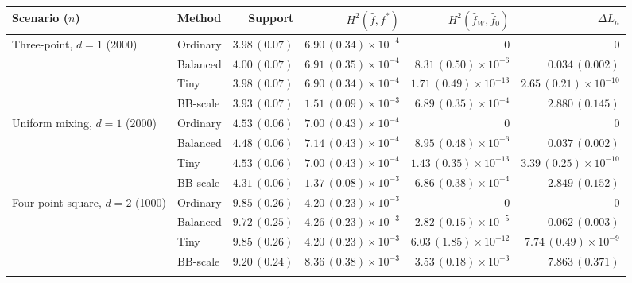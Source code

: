 \begin{tabular}{@{}llrrrr@{}}
\toprule
Scenario ($n$) & Method & Support & $H^2(\widehat f,f^*)$ & $H^2(\widehat f_W,\widehat f_0)$ & $\Delta L_n$ \\
\midrule
Three-point, $d=1$ (2000) & Ordinary & $3.98\,(0.07)$ & $6.90\,(0.34)\times 10^{-4}$ & $0$ & $0$ \\
 & Balanced & $4.00\,(0.07)$ & $6.91\,(0.35)\times 10^{-4}$ & $8.31\,(0.50)\times 10^{-6}$ & $0.034\,(0.002)$ \\
 & Tiny & $3.98\,(0.07)$ & $6.90\,(0.34)\times 10^{-4}$ & $1.71\,(0.49)\times 10^{-13}$ & $2.65\,(0.21)\times 10^{-10}$ \\
 & BB-scale & $3.93\,(0.07)$ & $1.51\,(0.09)\times 10^{-3}$ & $6.89\,(0.35)\times 10^{-4}$ & $2.880\,(0.145)$ \\
\addlinespace
Uniform mixing, $d=1$ (2000) & Ordinary & $4.53\,(0.06)$ & $7.00\,(0.43)\times 10^{-4}$ & $0$ & $0$ \\
 & Balanced & $4.48\,(0.06)$ & $7.14\,(0.43)\times 10^{-4}$ & $8.95\,(0.48)\times 10^{-6}$ & $0.037\,(0.002)$ \\
 & Tiny & $4.53\,(0.06)$ & $7.00\,(0.43)\times 10^{-4}$ & $1.43\,(0.35)\times 10^{-13}$ & $3.39\,(0.25)\times 10^{-10}$ \\
 & BB-scale & $4.31\,(0.06)$ & $1.37\,(0.08)\times 10^{-3}$ & $6.86\,(0.38)\times 10^{-4}$ & $2.849\,(0.152)$ \\
\addlinespace
Four-point square, $d=2$ (1000) & Ordinary & $9.85\,(0.26)$ & $4.20\,(0.23)\times 10^{-3}$ & $0$ & $0$ \\
 & Balanced & $9.72\,(0.25)$ & $4.26\,(0.23)\times 10^{-3}$ & $2.82\,(0.15)\times 10^{-5}$ & $0.062\,(0.003)$ \\
 & Tiny & $9.85\,(0.26)$ & $4.20\,(0.23)\times 10^{-3}$ & $6.03\,(1.85)\times 10^{-12}$ & $7.74\,(0.49)\times 10^{-9}$ \\
 & BB-scale & $9.20\,(0.24)$ & $8.36\,(0.38)\times 10^{-3}$ & $3.53\,(0.18)\times 10^{-3}$ & $7.863\,(0.371)$ \\
\addlinespace
\bottomrule
\end{tabular}